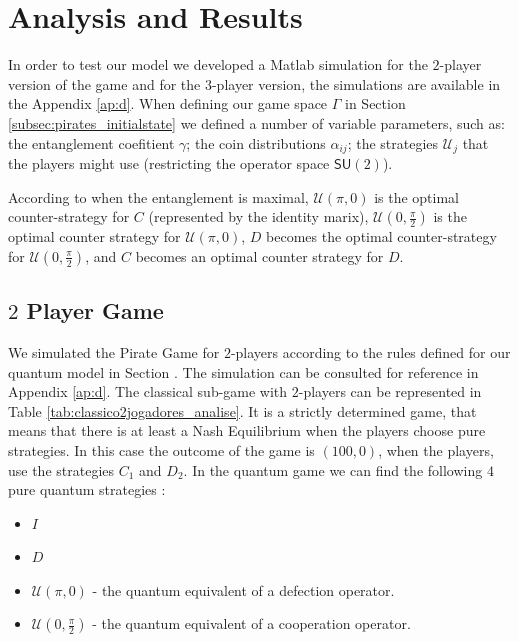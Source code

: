 \section{Analysis and Results}
\label{sec:description_3}


In order to test our model we developed a Matlab simulation for the $2$-player version of the game and for the $3$-player version, the simulations are available in the Appendix \ref{ap:d}. When defining our game space $\Gamma$ in Section \ref{subsec:pirates_initialstate} we defined a number of variable parameters, such as: the entanglement coefitient $\gamma$; the coin distributions $\alpha_{ij}$; the strategies $\mathcal{U}_{j}$ that the players might use (restricting the operator space $\mathsf{SU}(2)$).

According to \cite{Du} when the entanglement is maximal, $\mathcal{U}(\pi, 0)$ is the optimal counter-strategy for $C$ (represented by the identity marix), $\mathcal{U}(0, \frac{\pi}{2})$ is the optimal counter strategy for $\mathcal{U}(\pi, 0)$, $D$ becomes the optimal counter-strategy for $\mathcal{U}(0, \frac{\pi}{2})$, and $C$ becomes an optimal counter strategy for $D$.

\subsection{$2$ Player Game}
\label{subsec:2playergame}

We simulated the Pirate Game for $2$-players according to the rules defined for our quantum model in Section . The simulation can be consulted for reference in Appendix \ref{ap:d}. The classical sub-game with $2$-players can be represented in Table \ref{tab:classico2jogadores_analise}. It is a strictly determined game, that means that there is at least a Nash Equilibrium when the players choose pure strategies\cite{Leyton-Brown2008:Essentials_Game_Theory}. In this case the outcome of the game is $(100, 0)$, when the players, use the strategies $C_{1}$ and $D_{2}$.  In the quantum game we can find the following $4$ pure quantum strategies :

\begin{itemize}

\item $I$

\item $D$

\item $\mathcal{U}( \pi, 0)$ - the quantum equivalent of a defection operator.

\item $\mathcal{U}( 0, \frac{\pi}{2})$ - the quantum equivalent of a cooperation operator.

\end{itemize}

